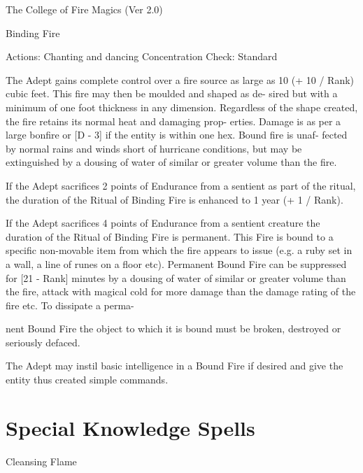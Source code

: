 \begin{Chapter}{The College of Fire Magics (Ver 2.0)}
\begin{ritual}[Q-1]{Binding Fire }

Actions: Chanting and dancing 
Concentration Check: Standard 
\begin{effects}
 The  Adept  gains  complete  control  over  a 
fire source as large as 10 (+ 10 / Rank) cubic feet. 
This  fire  may  then  be  moulded  and  shaped  as  de-
sired but with a minimum of one foot thickness in 
any  dimension.  Regardless  of  the  shape  created, 
the fire retains its normal heat and damaging prop-
erties. Damage is as per a large bonfire or [D - 3] if 
the  entity  is  within  one  hex.  Bound  fire  is  unaf-
fected by normal rains and winds short of hurricane 
conditions,  but  may  be  extinguished  by  a  dousing 
of water of similar or greater volume than the fire. 

If the Adept sacrifices 2 points of Endurance from 
a  sentient  as  part  of  the  ritual,  the  duration  of  the 
Ritual of Binding Fire is enhanced to 1 year (+ 1 / 
Rank). 

If the Adept sacrifices 4 points of Endurance from 
a  sentient  creature  the  duration  of  the  Ritual  of 
Binding Fire is permanent. This Fire  is bound to a 
specific  non-movable  item  from  which  the  fire 
appears to issue (e.g. a ruby set in a wall, a line of 
runes on a floor etc). Permanent Bound Fire can be 
suppressed for [21 - Rank] minutes by a dousing of 
water  of  similar  or  greater  volume  than  the  fire, 
attack with magical cold for more damage than the 
damage rating of the fire etc. To dissipate a perma-

nent  Bound  Fire  the  object  to  which  it  is  bound 
must be broken, destroyed or seriously defaced. 

The Adept may instil basic intelligence in a Bound 
Fire  if  desired  and  give  the  entity  thus  created 
simple commands. 


\end{effects}
\end{ritual}

\section{Special Knowledge Spells}

\begin{spell}[S-1]{Cleansing Flame }


\end{spell}
\end{Chapter}
